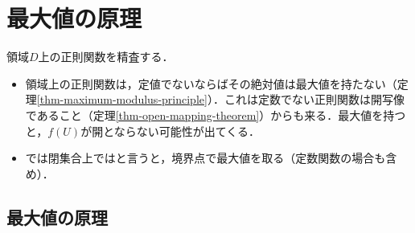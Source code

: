 \documentclass[uplatex, dvipdfmx]{jsreport}
\begin{document}
\section{最大値の原理}

\begin{screen}
    領域$D$上の正則関数を精査する．
    \begin{itemize}
        \item 領域上の正則関数は，定値でないならばその絶対値は最大値を持たない（定理\ref{thm-maximum-modulus-principle}）．これは定数でない正則関数は開写像であること（定理\ref{thm-open-mapping-theorem}）からも来る．最大値を持つと，$f(U)$が開とならない可能性が出てくる．
        \item では閉集合上ではと言うと，境界点で最大値を取る（定数関数の場合も含め）．
    \end{itemize}
\end{screen}

\subsection{最大値の原理}
\end{document}

